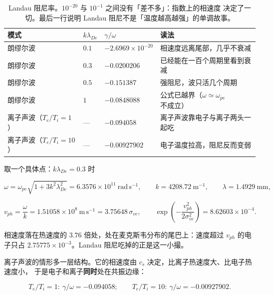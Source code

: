 \begin{table}[htbp]
\centering
\small
\caption{Landau 阻尼率。$10^{-20}$ 与 $10^{-1}$ 之间没有「差不多」：指数上的相速度
决定了一切。最后一行说明 Landau 阻尼不是「温度越高越强」的单调故事。}
\label{tab:app-ae-landau}
\begin{tabular}{p{3.0cm}p{2.6cm}p{2.8cm}p{4.8cm}}
\toprule
模式 & $k\lambda_{De}$ & $\gamma/\omega$ & 读法 \\
\midrule
朗缪尔波 & $0.1$ & $-2.6969\times10^{-20}$ & 相速度远离尾部，几乎不衰减 \\
朗缪尔波 & $0.3$ & $-0.0200206$ & 已经能在一百个周期里看到衰减 \\
朗缪尔波 & $0.5$ & $-0.151387$ & 强阻尼，波只活几个周期 \\
朗缪尔波 & $1$ & $-0.0848088$ & 公式已越界（$\omega\simeq\omega_{pe}$ 不成立） \\
离子声波（$T_e/T_i=1$） & --- & $-0.094058$ & 离子声波靠电子与离子两头一起吃 \\
离子声波（$T_e/T_i=10$） & --- & $-0.00927902$ & 电子温度拉高，阻尼反而变弱 \\
\bottomrule
\end{tabular}

\end{table}

取一个具体点：$k\lambda_{De}=0.3$ 时

\begin{equation}
\omega=\omega_{pe}\sqrt{1+3k^2\lambda_{De}^2}=6.3576\times10^{11}\ \mathrm{rad\,s^{-1}},\qquad
k=4208.72\ \mathrm{m^{-1}},\qquad
\lambda=1.4929\ \mathrm{mm},
\label{eq:app-ae-resonance}
\end{equation}

\begin{equation}
v_{ph}=\frac{\omega}{k}=1.51058\times10^{8}\ \mathrm{m\,s^{-1}}
=3.75648\,\sigma_{ve},\qquad
\exp\!\left(-\frac{v_{ph}^2}{2\sigma_{ve}^2}\right)=8.62603\times10^{-4} .
\label{eq:app-ae-resonance2}
\end{equation}

相速度落在热速度的 $3.76$ 倍处，处在麦克斯韦分布的尾巴上：速度超过 $v_{ph}$ 的电子只占
$2.75775\times10^{-3}$。Landau 阻尼吃掉的正是这一小撮。

离子声波的情形多一层结构。它的相速度由 $c_s$ 决定，比离子热速度大、比电子热速度小，
于是电子和离子\textbf{同时}处在共振边缘：

\begin{equation}
T_e/T_i=1:\ \gamma/\omega=-0.094058;\qquad
T_e/T_i=10:\ \gamma/\omega=-0.00927902 .
\label{eq:app-ae-ionacoustic}
\end{equation}


